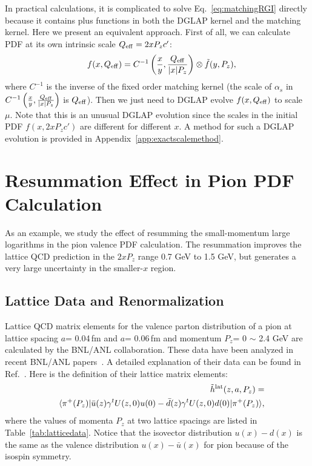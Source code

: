 \documentclass[prd,aps,twocolumn,preprintnumbers, showpacs, nofootinbib,superscriptaddress,notitlepage]{revtex4-2}
\def\bea{\begin{eqnarray}}
\def\eea{\end{eqnarray}}
\begin{document}
In practical calculations, it is complicated to solve Eq.~\eqref{eq:matchingRGI} directly because it contains plus functions in both the DGLAP kernel and the matching kernel. Here we 
present an equivalent approach. First of all, we can
calculate PDF at its own intrinsic scale $Q_{\rm eff}=2 x P_z c'$:
\bea
&&f(x,Q_{\rm eff}) = C^{-1}\left(\frac{x}{y}, \frac{Q_{\rm eff}}{|x| P_{z}}\right) \otimes \tilde{f}(y,P_z),
\eea
where $C^{-1}$ is the inverse of the fixed order matching kernel (the scale of $\alpha_s$ in $C^{-1}\left(\frac{x}{y}, \frac{Q_{\rm eff}}{|x| P_{z}}\right)$ is $Q_{\rm eff}$). Then we just need to DGLAP evolve $f(x,Q_{\rm eff})$ to scale $\mu$. Note that this is an unusual DGLAP evolution since the scales in the initial PDF $f(x,2 x P_z c')$ are different for different $x$. A method for such a DGLAP evolution is provided in Appendix~\ref{app:exactscalemethod}.

\section{Resummation Effect in Pion PDF Calculation}\label{sec:RGI}

As an example, we study the effect of resumming the small-momentum large
logarithms in the pion valence PDF calculation.  
The resummation improves the lattice QCD prediction
in the $2 x P_z$ range 0.7 GeV to 1.5 GeV, but generates a 
very large uncertainty in the smaller-$x$ region. 

\subsection{Lattice Data and Renormalization}\label{sec:latticedata}
Lattice QCD matrix elements for the valence parton distribution of a pion at lattice spacing $a$= 0.04\,fm and $a$= 0.06\,fm and momentum $P_{z}$= 0 $\sim$ 2.4 GeV are calculated by the BNL/ANL collaboration. These data have been analyzed in recent BNL/ANL papers~\cite{Gao:2020ito,Gao:2021hxl,Gao:2021dbh}. A detailed explanation of their data can be found in Ref.~\cite{Gao:2020ito}. Here is the definition of their lattice matrix elements:
\bea\label{eq:latM}
&&\tilde{h}^{\rm lat}(z, a, P_{z}) = \\ 
&&\langle \pi^{+}(P_z)| \bar{u}(z) \gamma^{t} U(z,0) u(0) - \bar{d}(z) \gamma^{t} U(z,0) d(0) |\pi^{+}(P_z) \rangle, \nonumber
\eea
where the values of momenta $P_{z}$ at two lattice spacings are listed in Table~\ref{tab:latticedata}. Notice that the isovector distribution $u(x)-d(x)$ is the same as the valence distribution $u(x)-\bar{u}(x)$ for pion because of the isospin symmetry. 
\end{document}

